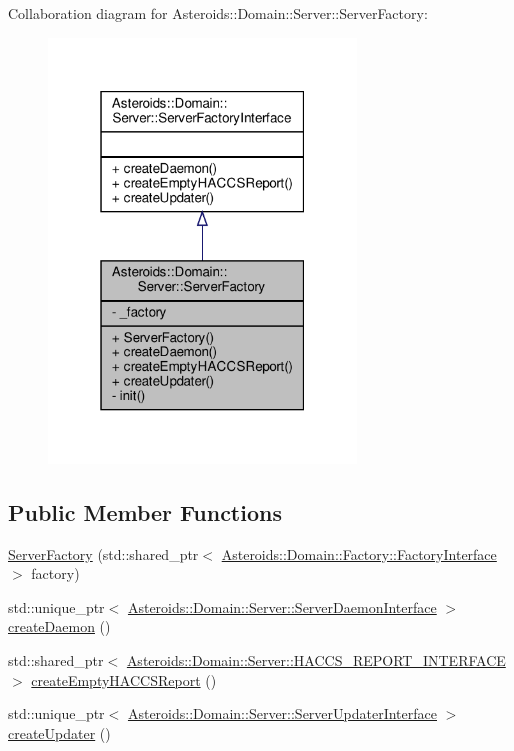 Collaboration diagram for Asteroids\+:\+:Domain\+:\+:Server\+:\+:Server\+Factory\+:\nopagebreak
\begin{figure}[H]
\begin{center}
\leavevmode
\includegraphics[width=232pt]{classAsteroids_1_1Domain_1_1Server_1_1ServerFactory__coll__graph}
\end{center}
\end{figure}
\subsection*{Public Member Functions}
\begin{DoxyCompactItemize}
\item 
\hyperlink{classAsteroids_1_1Domain_1_1Server_1_1ServerFactory_a7de2a922987247b12190afb667d64fe4}{Server\+Factory} (std\+::shared\+\_\+ptr$<$ \hyperlink{classAsteroids_1_1Domain_1_1Factory_1_1FactoryInterface}{Asteroids\+::\+Domain\+::\+Factory\+::\+Factory\+Interface} $>$ factory)
\item 
std\+::unique\+\_\+ptr$<$ \hyperlink{classAsteroids_1_1Domain_1_1Server_1_1ServerDaemonInterface}{Asteroids\+::\+Domain\+::\+Server\+::\+Server\+Daemon\+Interface} $>$ \hyperlink{classAsteroids_1_1Domain_1_1Server_1_1ServerFactory_abcb3f5aae1910a28b5b1f574d9b1c57e}{create\+Daemon} ()
\item 
std\+::shared\+\_\+ptr$<$ \hyperlink{classAsteroids_1_1Domain_1_1Server_1_1HACCS__REPORT__INTERFACE}{Asteroids\+::\+Domain\+::\+Server\+::\+H\+A\+C\+C\+S\+\_\+\+R\+E\+P\+O\+R\+T\+\_\+\+I\+N\+T\+E\+R\+F\+A\+CE} $>$ \hyperlink{classAsteroids_1_1Domain_1_1Server_1_1ServerFactory_ab02d2953b438f3532f183d640f5391ec}{create\+Empty\+H\+A\+C\+C\+S\+Report} ()
\item 
std\+::unique\+\_\+ptr$<$ \hyperlink{classAsteroids_1_1Domain_1_1Server_1_1ServerUpdaterInterface}{Asteroids\+::\+Domain\+::\+Server\+::\+Server\+Updater\+Interface} $>$ \hyperlink{classAsteroids_1_1Domain_1_1Server_1_1ServerFactory_a151bf3c05e01e2f0d288a3aa97cbfec0}{create\+Updater} ()
\end{DoxyCompactItemize}
